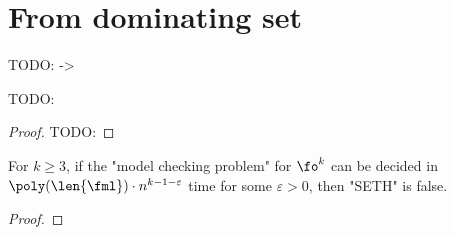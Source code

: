 \section{From dominating set}\label{sect: from dominating set}

\begin{yoshiki}
    TODO: ->
\end{yoshiki}

\begin{proposition}\label{proposition: SETH dominating set}
    TODO:
\end{proposition}
\begin{proof}
    TODO:
\end{proof}

\begin{corollary}\label{corollary: SETH dominating set}
    For $k \ge 3$,
    if the "model checking problem" for $\fo^{k}$  can be decided in $\poly(\len{\fml}) \cdot n^{k - 1 - \varepsilon}$ time for some $\varepsilon > 0$,
    then "SETH" is false.
\end{corollary}
\begin{proof}
\end{proof}

\cite{williamsFasterDecisionFirstorder2014}


